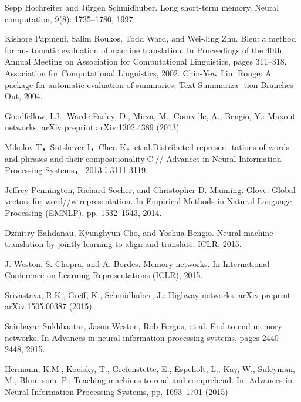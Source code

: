\documentclass{article}
\begin{document}
\begin{thebibliography}{99}
    Sepp Hochreiter and Jürgen Schmidhuber. Long short-term memory. Neural computation, 9(8):
    1735–1780, 1997.

    Kishore Papineni, Salim Roukos, Todd Ward, and Wei-Jing Zhu. Bleu: a method for au-
    tomatic evaluation of machine translation. In Proceedings of the 40th Annual Meeting on
    Association for Computational Linguistics, pages 311–318. Association for Computational
    Linguistics, 2002.
    Chin-Yew Lin. Rouge: A package for automatic evaluation of summaries. Text Summariza-
    tion Branches Out, 2004.

    Goodfellow, I.J., Warde-Farley, D., Mirza, M., Courville, A., Bengio, Y.: Maxout networks.
    arXiv preprint arXiv:1302.4389 (2013)

    Mikolov T，Sutskever I，Chen K，et al.Distributed represen-
    tations of words and phrases and their compositionality[C]//
    Advances in Neural Information Processing Systems，
    2013：3111-3119.

    Jeffrey Pennington, Richard Socher, and Christopher D. Manning. Glove: Global vectors for
    word//w representation. In Empirical Methods in Natural Language Processing (EMNLP), pp.
    1532–1543, 2014.

    Dzmitry Bahdanau, Kyunghyun Cho, and Yoshua Bengio. Neural machine translation by jointly
    learning to align and translate. ICLR, 2015.

    J. Weston, S. Chopra, and A. Bordes. Memory networks. In International Conference on
    Learning Representations (ICLR), 2015.

    Srivastava, R.K., Greff, K., Schmidhuber, J.: Highway networks.
    arXiv preprint
    arXiv:1505.00387 (2015)

    Sainbayar Sukhbaatar, Jason Weston, Rob Fergus, et al. End-to-end memory networks. In
    Advances in neural information processing systems, pages 2440–2448, 2015.

    Hermann, K.M., Kocisky, T., Grefenstette, E., Espeholt, L., Kay, W., Suleyman, M., Blun-
    som, P.: Teaching machines to read and comprehend. In: Advances in Neural Information
    Processing Systems, pp. 1693–1701 (2015)


\end{thebibliography}
\end{document}
